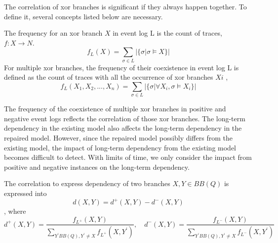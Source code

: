 The correlation of xor branches is significant if they always happen together. To define it, several concepts listed below are necessary. 
\begin{definition}
	The frequency for an xor branch $X$ in event log L is the count of traces, $f: X \rightarrow N$.   
	\[f_{L}(X) = \sum_{\sigma \in L} |\{\sigma \vert \sigma \models X\} |\]
	For multiple xor branches, the frequency of their coexistence in event log L is defined as the count of traces with all the occurrence of xor branches ${Xi}$ , \[f_{L}(X_1, X_2,...,X_n)= \sum_{\sigma \in L} |\{\sigma \vert \forall X_i, \sigma \models X_i\} | \]
\end{definition}
The frequency of the coexistence of multiple xor branches in positive and negative event logs reflects the correlation of those xor branches. The long-term dependency in the existing model also affects the long-term dependency in the repaired model. However, since the repaired model possibly differs from the existing model, the impact of long-term dependency from the existing model becomes difficult to detect. With limits of time, we only consider the impact from positive and negative instances on the long-term dependency.
\begin{definition} The correlation to express dependency of two branches $X,Y \in BB(Q)$ is expressed into
	\[d(X,Y)=  d^{+}(X, Y) -d^{-}(X, Y)\], where 
	\[d^{+}(X, Y)= \frac{f_{L^+}(X, Y)}{\sum_{Y^\prime BB(Q), Y^\prime \neq X} f_{L^+}(X, Y^\prime)}, \quad d^{-}(X, Y)= \frac{f_{L^-}(X, Y)}{\sum_{Y^\prime BB(Q), Y^\prime \neq X} f_{L^-}(X, Y^\prime)}\]	
\end{definition}
